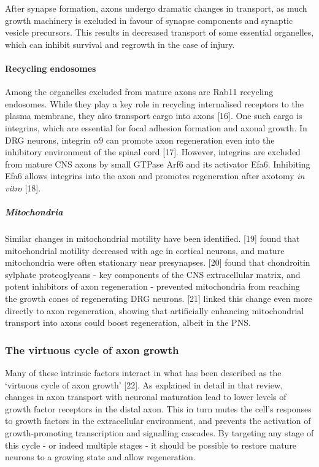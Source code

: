 \documentclass[
  12pt,
  a4paper,
]{book}
\begin{document}
After synapse formation, axons undergo dramatic changes in transport, as much growth machinery is excluded in favour of synapse components and synaptic vesicle precursors. This results in decreased transport of some essential organelles, which can inhibit survival and regrowth in the case of injury.

\hypertarget{recycling-endosomes}{%
\paragraph{Recycling endosomes}\label{recycling-endosomes}}

Among the organelles excluded from mature axons are Rab11 recycling endosomes. While they play a key role in recycling internalised receptors to the plasma membrane, they also transport cargo into axons {[}16{]}. One such cargo is integrins, which are essential for focal adhesion formation and axonal growth. In DRG neurons, integrin \(\alpha9\) can promote axon regeneration even into the inhibitory environment of the spinal cord {[}17{]}. However, integrins are excluded from mature CNS axons by small GTPase Arf6 and its activator Efa6. Inhibiting Efa6 allows integrins into the axon and promotes regeneration after axotomy \emph{in vitro} {[}18{]}.

\hypertarget{mitochondria}{%
\subparagraph{Mitochondria}\label{mitochondria}}

Similar changes in mitochondrial motility have been identified. {[}19{]} found that mitochondrial motility decreased with age in cortical neurons, and mature mitochondria were often stationary near presynapses. {[}20{]} found that chondroitin sylphate proteoglycans - key components of the CNS extracellular matrix, and potent inhibitors of axon regeneration - prevented mitochondria from reaching the growth cones of regenerating DRG neurons. {[}21{]} linked this change even more directly to axon regeneration, showing that artificially enhancing mitochondrial transport into axons could boost regeneration, albeit in the PNS.

\hypertarget{the-virtuous-cycle-of-axon-growth}{%
\subsubsection{The virtuous cycle of axon growth}\label{the-virtuous-cycle-of-axon-growth}}

Many of these intrinsic factors interact in what has been described as the `virtuous cycle of axon growth' {[}22{]}. As explained in detail in that review, changes in axon transport with neuronal maturation lead to lower levels of growth factor receptors in the distal axon. This in turn mutes the cell's responses to growth factors in the extracellular environment, and prevents the activation of growth-promoting transcription and signalling cascades. By targeting any stage of this cycle - or indeed multiple stages - it should be possible to restore mature neurons to a growing state and allow regeneration.
\end{document}
